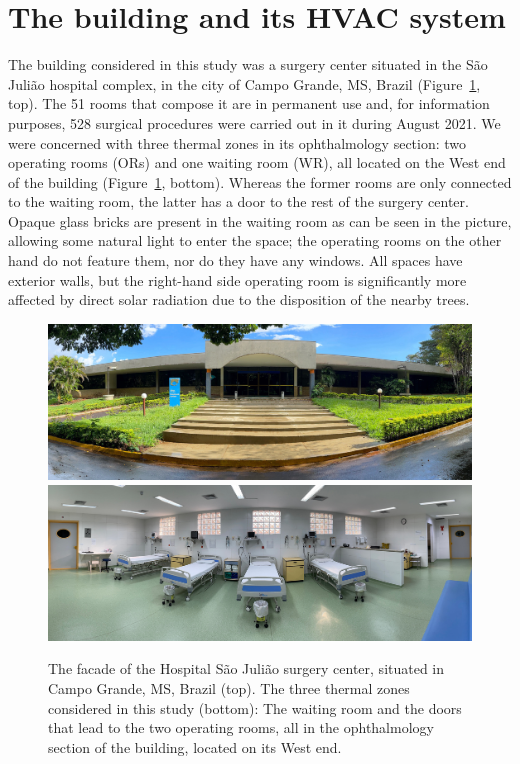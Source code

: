 \section{The building and its HVAC system}

The building considered in this study was a surgery center situated in the São Julião hospital complex, in the city of Campo Grande, MS, Brazil (Figure~\ref{fig.facadeAndRooms}, top). The 51 rooms that compose it are in permanent use and, for information purposes, 528 surgical procedures were carried out in it during August 2021. We were concerned with three thermal zones in its ophthalmology section: two operating rooms (ORs) and one waiting room (WR), all located on the West end of the building (Figure~\ref{fig.facadeAndRooms}, bottom). Whereas the former rooms are only connected to the waiting room, the latter has a door to the rest of the surgery center. Opaque glass bricks are present in the waiting room as can be seen in the picture, allowing some natural light to enter the space; the operating rooms on the other hand do not feature them, nor do they have any windows. All spaces have exterior walls, but the right-hand side operating room is significantly more affected by direct solar radiation due to the disposition of the nearby trees.

\begin{figure}[!t]
	\centering
	\includegraphics[width=0.9\linewidth]{../images/chap3_facade.jpg} \\[8pt]
	\includegraphics[width=0.9\linewidth]{../images/chap3_rooms.jpg} 
	\caption{The facade of the Hospital São Julião surgery center, situated in Campo Grande, MS, Brazil (top). The three thermal zones considered in this study (bottom): The waiting room and the doors that lead to the two operating rooms, all in the ophthalmology section of the building, located on its West end.}
	\label{fig.facadeAndRooms}
\end{figure}

